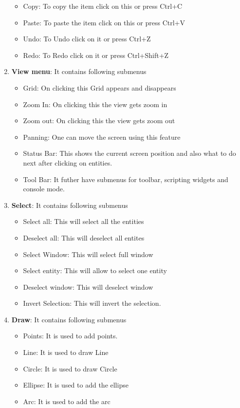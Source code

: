 \begin{enumerate}
\begin{itemize}
\item Copy: To copy the item click on this or press Ctrl+C
\item Paste: To paste the item click on this or press Ctrl+V
\item Undo: To Undo click on it or press Ctrl+Z
\item Redo: To Redo click on it or press Ctrl+Shift+Z
\end{itemize}
\item \textbf{View menu}: It contains following submenus
\begin{itemize}
\item Grid: On clicking this Grid appears and disappears
\item Zoom In: On clicking this the view gets zoom in
\item Zoom out: On clicking this the view gets zoom out
\item Panning: One can move the screen using this feature
\item Status Bar: This shows the current screen position and also what to do next after clicking on entities. 
\item Tool Bar: It futher have submenus for toolbar, scripting widgets and console mode.
\end{itemize}
\item \textbf{Select}: It contains following submenus
\begin{itemize}
\item Select all: This will select all the entities
\item Deselect all: This will deselect all entites 
\item Select Window: This will select full window
\item Select entity: This will allow to select one entity
\item Deselect window: This will deselect window 
\item Invert Selection: This will invert the selection.
\end{itemize}
\item \textbf{Draw}: It contains following submenus
\begin{itemize}
\item Points: It is used to add points.
\item Line: It is used to draw Line
\item Circle: It is used to draw Circle
\item Ellipse: It is used to add the ellipse
\item Arc: It is used to add the arc

\end{itemize}
\end{enumerate}
